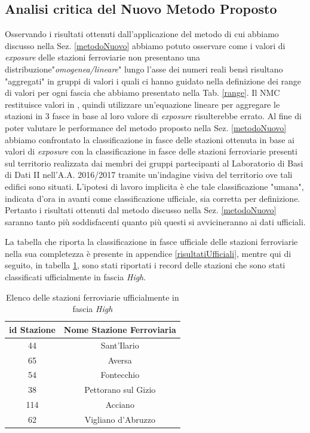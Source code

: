 \subsection{Analisi critica del Nuovo Metodo Proposto}
\label{analisicritica}
Osservando i risultati ottenuti dall'applicazione del metodo di cui abbiamo discusso nella Sez. \ref{metodoNuovo} abbiamo potuto osservare come i valori di \textit{exposure} delle stazioni ferroviarie non presentano una distribuzione\newline "\textit{omogenea/lineare}" lungo l'asse dei numeri reali bensì risultano "aggregati" in gruppi di valori i quali ci hanno guidato nella definizione dei range di valori per ogni fascia che abbiamo presentato nella Tab. \ref{range}.
Il NMC restituisce valori in , quindi utilizzare un'equazione lineare per aggregare le stazioni in 3 fasce in base al loro valore di \textit{exposure} risulterebbe errato.
Al fine di poter valutare le performance del metodo proposto nella Sez. \ref{metodoNuovo} abbiamo confrontato la classificazione in fasce delle stazioni ottenuta in base ai valori di \textit{exposure} con la classificazione in fasce delle stazioni ferroviarie presenti sul territorio realizzata dai membri dei gruppi partecipanti al Laboratorio di Basi di Dati II nell'A.A. 2016/2017 tramite un'indagine visiva del territorio ove tali edifici sono situati. L'ipotesi di lavoro implicita è che tale classificazione "umana", indicata d'ora in avanti come classificazione ufficiale, sia corretta per definizione. Pertanto i risultati ottenuti dal metodo discusso nella Sez. \ref{metodoNuovo} saranno tanto più soddisfacenti quanto più questi si avvicineranno ai dati ufficiali.

La tabella che riporta la classificazione in fasce ufficiale delle stazioni ferroviarie nella sua completezza è presente in appendice \ref{risultatiUfficiali}, mentre qui di seguito, in tabella \ref{fasciaHighUfficiale}, sono stati riportati i record delle stazioni che sono stati classificati ufficialmente in fascia \textit{High}.
\begin{table}[h]
\centering
\begin{tabular}{|c|c|}
\hline
\rowcolor{lightgray}
\textbf{id Stazione} & \textbf{Nome Stazione Ferroviaria} \\
\hline
\rowcolor{flamingopink}
44 & Sant'Ilario \\
\hline
\rowcolor{flamingopink}
65 & Aversa \\\hline
\rowcolor{flamingopink}
54 & Fontecchio \\\hline
\rowcolor{flamingopink}
38 & Pettorano sul Gizio \\\hline
\rowcolor{flamingopink}
114 & Acciano \\\hline
\rowcolor{flamingopink}
62 & Vigliano d'Abruzzo \\
\hline
\end{tabular}
\caption{Elenco delle stazioni ferroviarie ufficialmente in fascia \textit{High}}
\label{fasciaHighUfficiale}
\end{table}

